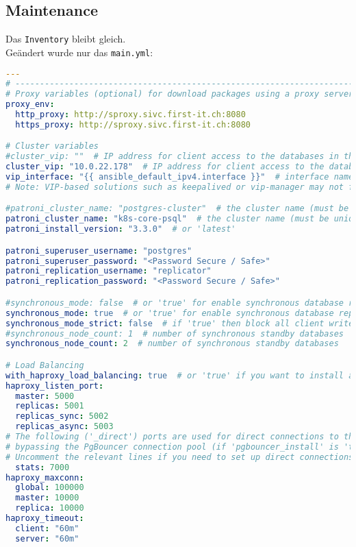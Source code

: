 \begin{flushleft}
\begin{lstlisting}[language=bash, caption=Deploy - Anhang - Deployt,captionpos=b,label={lst:deploy-appendix-deployt},breaklines=true]
    \end{lstlisting}

    \subsection{Maintenance}
    Das \texttt{Inventory} bleibt gleich.\\
    Geändert wurde nur das \texttt{main.yml}:
    \lstset{style=gra_codestyle}
    \begin{lstlisting}[language=yaml, caption=Testsystem - Anhang - Maintenance - main.yml,captionpos=b,label={lst:testsystem-maintenance-main.yml},breaklines=true]
---
# ---------------------------------------------------------------------
# Proxy variables (optional) for download packages using a proxy server
proxy_env:
  http_proxy: http://sproxy.sivc.first-it.ch:8080
  https_proxy: http://sproxy.sivc.first-it.ch:8080

# Cluster variables
#cluster_vip: ""  # IP address for client access to the databases in the cluster (optional).
cluster_vip: "10.0.22.178"  # IP address for client access to the databases in the cluster (optional).
vip_interface: "{{ ansible_default_ipv4.interface }}"  # interface name (e.g., "ens32").
# Note: VIP-based solutions such as keepalived or vip-manager may not function correctly in cloud environments like AWS.

#patroni_cluster_name: "postgres-cluster"  # the cluster name (must be unique for each cluster)
patroni_cluster_name: "k8s-core-psql"  # the cluster name (must be unique for each cluster)
patroni_install_version: "3.3.0"  # or 'latest'

patroni_superuser_username: "postgres"
patroni_superuser_password: "<Password Secure / Safe>"
patroni_replication_username: "replicator"
patroni_replication_password: "<Password Secure / Safe>"

#synchronous_mode: false  # or 'true' for enable synchronous database replication
synchronous_mode: true  # or 'true' for enable synchronous database replication
synchronous_mode_strict: false  # if 'true' then block all client writes to the master, when a synchronous replica is not available
#synchronous_node_count: 1  # number of synchronous standby databases
synchronous_node_count: 2  # number of synchronous standby databases

# Load Balancing
with_haproxy_load_balancing: true  # or 'true' if you want to install and configure the load-balancing
haproxy_listen_port:
  master: 5000
  replicas: 5001
  replicas_sync: 5002
  replicas_async: 5003
# The following ('_direct') ports are used for direct connections to the PostgreSQL database,
# bypassing the PgBouncer connection pool (if 'pgbouncer_install' is 'true').
# Uncomment the relevant lines if you need to set up direct connections.
  stats: 7000
haproxy_maxconn:
  global: 100000
  master: 10000
  replica: 10000
haproxy_timeout:
  client: "60m"
  server: "60m"


\end{lstlisting}
\end{flushleft}
